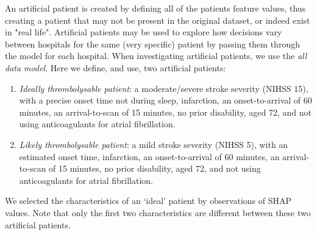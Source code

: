 An artificial patient is created by defining all of the patients feature values, thus creating a patient that may not be present in the original dataset, or indeed exist in "real life". Artificial patients may be used to explore how decisions vary between hospitals for the same (very specific) patient by passing them through the model for each hospital. When investigating artificial patients, we use the \emph{all data model}. Here we define, and use, two artificial patients: 
\begin{enumerate}
    \item \emph{Ideally thrombolysable patient}: a moderate/severe stroke severity (NIHSS 15), with a precise onset time not during sleep, infarction, an onset-to-arrival of 60 minutes, an arrival-to-scan of 15 minutes, no prior disability, aged 72, and not using anticoagulants for atrial fibrillation.
    \item \emph{Likely thrombolysable patient}: a mild stroke severity (NIHSS 5), with an estimated onset time, infarction, an onset-to-arrival of 60 minutes, an arrival-to-scan of 15 minutes, no prior disability, aged 72, and not using anticoagulants for atrial fibrillation. 
\end{enumerate}

We selected the characteristics of an `ideal' patient by observations of SHAP values. Note that only the first two characteristics are different between these two artificial patients.